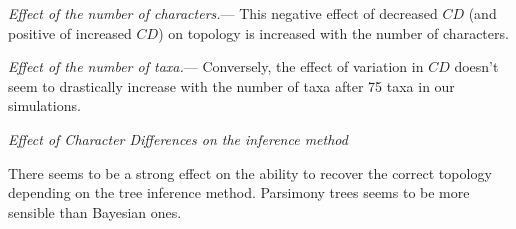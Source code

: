 \documentclass[12pt,letterpaper]{article}
\renewcommand{\subsection}[1]{%
\bigskip
\begin{center}
\begin{large}
\normalfont\itshape #1
\end{large}
\end{center}}
\renewcommand{\subsubsection}[1]{%
\vspace{2ex}
\noindent
\textit{#1.}---}
\begin{document}
\subsubsection{Effect of the number of characters}
This negative effect of decreased $CD$ (and positive of increased $CD$) on topology is increased with the number of characters.

\subsubsection{Effect of the number of taxa}
Conversely, the effect of variation in $CD$ doesn't seem to drastically increase with the number of taxa after 75 taxa in our simulations.

\subsection{Effect of Character Differences on the inference method}
There seems to be a strong effect on the ability to recover the correct topology depending on the tree inference method.
Parsimony trees seems to be more sensible than Bayesian ones.
\end{document}
